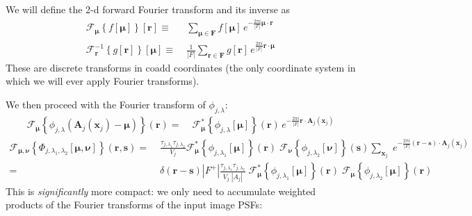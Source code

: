 \documentclass[DM,authoryear,toc]{lsstdoc}
\begin{document}
We will define the 2-d forward Fourier transform and its inverse as
\begin{align}
    \mathcal{F}_{\bm{\mu}}\!\left\{f[\bm{\mu}]\right\}\![\bm{r}]
    \equiv&\;
    \sum_{\bm{\mu}\in{\bm{F}}}
    f[\bm{\mu}]
    \,
    e^{-\frac{2\pi i}{|F|} \bm{\mu}\cdot\bm{r}}
    \\
    \mathcal{F}_{\bm{r}}^{-1}\!\left\{g[\bm{r}]\right\}\![\bm{\mu}]
    \equiv&\;
    \frac{1}{|F|}
    \sum_{\bm{r}\in\bm{F}}
    g[\bm{r}]
    \,
    e^{\frac{2\pi i}{|F|} \bm{r}\cdot\bm{\mu}}
\end{align}
These are discrete transforms in coadd coordinates (the only coordinate system in which we will ever apply Fourier transforms).

We then proceed with the Fourier transform of $\phi_{j,\lambda}$:
\begin{align}
    \mathcal{F}_{\bm{\mu}}\!\left\{
        \phi_{j,\lambda}\!\left(\bm{A}_j(\bm{x}_j) - \bm{\mu}\right)
    \right\}\!\left(\bm{r}\right)
    =&\;
    \mathcal{F}^*_{\bm{\mu}}\!\left\{
        \phi_{j,\lambda}\!\left[\bm{\mu}\right]
    \right\}\!\left(\bm{r}\right)
    \, e^{-\frac{2\pi i}{|F|} \bm{r}\cdot \bm{A}_j(\bm{x}_j)}
\end{align}
\begin{align}
    \mathcal{F}_{\bm{\mu},\bm{\nu}}\!\left\{
        \Phi_{j,\lambda_1,\lambda_2}[\bm{\mu},\bm{\nu}]
    \right\}\!\left(\bm{r},\bm{s}\right)
    =&\;
        \frac{
            \tau_{j,\lambda_1}
            \tau_{j,\lambda_2}
        }{
            V_j
        }
        \mathcal{F}^*_{\bm{\mu}}\!\left\{
            \phi_{j,\lambda_1}\!\left[\bm{\mu}\right]
        \right\}\!\left(\bm{r}\right)
        \;
        \mathcal{F}_{\bm{\nu}}\!\left\{
            \phi_{j,\lambda_2}\!\left[\bm{\nu}\right]
        \right\}\!\left(\bm{s}\right)
        \sum_{\bm{x}_j}
        \;
        e^{-\frac{2\pi i}{|F|} (\bm{r} - \bm{s}) \cdot \bm{A}_j(\bm{x}_j)}
    \\
    =&\;
        \delta\!\left(\bm{r}-\bm{s}\right)
        |F^+|
        \frac{
            \tau_{j,\lambda_1}
            \tau_{j,\lambda_2}
        }{
            V_j \; |A_j|
        }
        \;
        \mathcal{F}^*_{\bm{\mu}}\!\left\{
            \phi_{j,\lambda_1}\!\left[\bm{\mu}\right]
        \right\}\!\left(\bm{r}\right)
        \;
        \mathcal{F}_{\bm{\mu}}\!\left\{
            \phi_{j,\lambda_2}\!\left[\bm{\mu}\right]
        \right\}\!\left(\bm{r}\right)
\end{align}
This is \emph{significantly} more compact: we only need to accumulate weighted products of the Fourier transforms of the input image PSFs:
\end{document}
